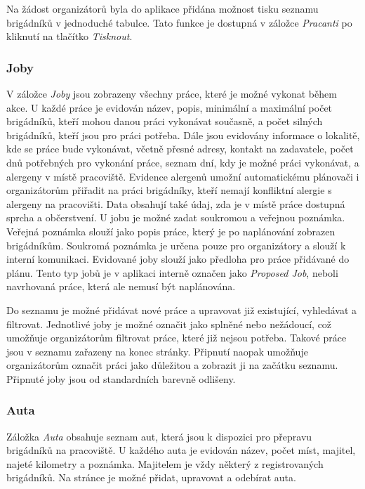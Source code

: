 Na žádost organizátorů byla do aplikace přidána možnost tisku seznamu brigádníků v jednoduché tabulce. Tato funkce je dostupná v záložce \textit{Pracanti} po kliknutí
na tlačítko \textit{Tisknout}.

\subsubsection{Joby}

V záložce \textit{Joby} jsou zobrazeny všechny práce, které je možné vykonat během akce. U každé práce je evidován název, popis, minimální
a maximální počet brigádníků, kteří mohou danou práci vykonávat současně, a počet silných brigádníků, kteří jsou pro práci potřeba. Dále jsou evidovány
informace o lokalitě, kde se práce bude vykonávat, včetně přesné adresy, kontakt na zadavatele, počet dnů potřebných pro vykonání práce, 
seznam dní, kdy je možné práci vykonávat, a alergeny v místě pracoviště. Evidence alergenů umožní automatickému plánovači i organizátorům přiřadit na práci brigádníky, kteří nemají
konfliktní alergie s alergeny na pracovišti. Data obsahují také údaj, zda je v místě práce dostupná sprcha a občerstvení. 
U jobu je možné zadat soukromou a veřejnou poznámka. Veřejná poznámka slouží jako popis práce, který je po naplánování
zobrazen brigádníkům. Soukromá poznámka je určena pouze pro organizátory a slouží k interní komunikaci. Evidované joby slouží jako předloha pro práce přidávané
do plánu. Tento typ jobů je v aplikaci interně označen jako \textit{Proposed Job}, neboli navrhovaná práce, která ale nemusí být naplánována.

Do seznamu je možné přidávat nové práce a upravovat již existující, vyhledávat a filtrovat.
Jednotlivé joby je možné označit jako splněné nebo nežádoucí, což umožňuje organizátorům filtrovat práce, které již nejsou potřeba. Takové práce jsou v seznamu
zařazeny na konec stránky. Připnutí naopak umožňuje organizátorům označit práci jako důležitou a zobrazit ji na začátku seznamu. Připnuté joby jsou od standardních
barevně odlišeny.

\subsubsection{Auta}

Záložka \textit{Auta} obsahuje seznam aut, která jsou k dispozici pro přepravu brigádníků na pracoviště. U každého auta je evidován název, počet míst, majitel,
najeté kilometry a poznámka. Majitelem je vždy některý z registrovaných brigádníků. Na stránce je možné přidat, upravovat a odebírat auta.

